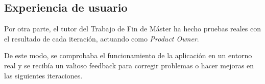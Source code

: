 \subsection{Experiencia de usuario}
\label{subsec:2.1.3}

Por otra parte, el tutor del Trabajo de Fin de Máster ha hecho pruebas reales con el resultado de cada iteración, actuando como {\it Product Owner}. 
\bigskip

De este modo, se comprobaba el funcionamiento de la aplicación en un entorno real y se recibía un valioso feedback para corregir problemas o hacer mejoras en las siguientes iteraciones.
